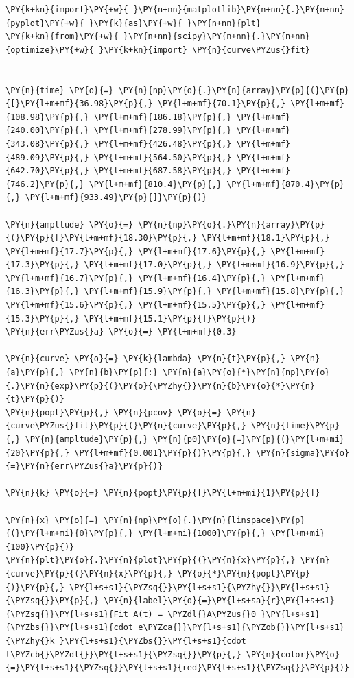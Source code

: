    \begin{tcolorbox}[breakable, size=fbox, boxrule=1pt, pad at break*=1mm,colback=cellbackground, colframe=cellborder]
\begin{Verbatim}[commandchars=\\\{\}]
\PY{k+kn}{import}\PY{+w}{ }\PY{n+nn}{matplotlib}\PY{n+nn}{.}\PY{n+nn}{pyplot}\PY{+w}{ }\PY{k}{as}\PY{+w}{ }\PY{n+nn}{plt}
\PY{k+kn}{from}\PY{+w}{ }\PY{n+nn}{scipy}\PY{n+nn}{.}\PY{n+nn}{optimize}\PY{+w}{ }\PY{k+kn}{import} \PY{n}{curve\PYZus{}fit}


\PY{n}{time} \PY{o}{=} \PY{n}{np}\PY{o}{.}\PY{n}{array}\PY{p}{(}\PY{p}{[}\PY{l+m+mf}{36.98}\PY{p}{,} \PY{l+m+mf}{70.1}\PY{p}{,} \PY{l+m+mf}{108.98}\PY{p}{,} \PY{l+m+mf}{186.18}\PY{p}{,} \PY{l+m+mf}{240.00}\PY{p}{,} \PY{l+m+mf}{278.99}\PY{p}{,} \PY{l+m+mf}{343.08}\PY{p}{,} \PY{l+m+mf}{426.48}\PY{p}{,} \PY{l+m+mf}{489.09}\PY{p}{,} \PY{l+m+mf}{564.50}\PY{p}{,} \PY{l+m+mf}{642.70}\PY{p}{,} \PY{l+m+mf}{687.58}\PY{p}{,} \PY{l+m+mf}{746.2}\PY{p}{,} \PY{l+m+mf}{810.4}\PY{p}{,} \PY{l+m+mf}{870.4}\PY{p}{,} \PY{l+m+mf}{933.49}\PY{p}{]}\PY{p}{)}

\PY{n}{ampltude} \PY{o}{=} \PY{n}{np}\PY{o}{.}\PY{n}{array}\PY{p}{(}\PY{p}{[}\PY{l+m+mf}{18.30}\PY{p}{,} \PY{l+m+mf}{18.1}\PY{p}{,} \PY{l+m+mf}{17.7}\PY{p}{,} \PY{l+m+mf}{17.6}\PY{p}{,} \PY{l+m+mf}{17.3}\PY{p}{,} \PY{l+m+mf}{17.0}\PY{p}{,} \PY{l+m+mf}{16.9}\PY{p}{,} \PY{l+m+mf}{16.7}\PY{p}{,} \PY{l+m+mf}{16.4}\PY{p}{,} \PY{l+m+mf}{16.3}\PY{p}{,} \PY{l+m+mf}{15.9}\PY{p}{,} \PY{l+m+mf}{15.8}\PY{p}{,} \PY{l+m+mf}{15.6}\PY{p}{,} \PY{l+m+mf}{15.5}\PY{p}{,} \PY{l+m+mf}{15.3}\PY{p}{,} \PY{l+m+mf}{15.1}\PY{p}{]}\PY{p}{)} 
\PY{n}{err\PYZus{}a} \PY{o}{=} \PY{l+m+mf}{0.3}

\PY{n}{curve} \PY{o}{=} \PY{k}{lambda} \PY{n}{t}\PY{p}{,} \PY{n}{a}\PY{p}{,} \PY{n}{b}\PY{p}{:} \PY{n}{a}\PY{o}{*}\PY{n}{np}\PY{o}{.}\PY{n}{exp}\PY{p}{(}\PY{o}{\PYZhy{}}\PY{n}{b}\PY{o}{*}\PY{n}{t}\PY{p}{)}
\PY{n}{popt}\PY{p}{,} \PY{n}{pcov} \PY{o}{=} \PY{n}{curve\PYZus{}fit}\PY{p}{(}\PY{n}{curve}\PY{p}{,} \PY{n}{time}\PY{p}{,} \PY{n}{ampltude}\PY{p}{,} \PY{n}{p0}\PY{o}{=}\PY{p}{(}\PY{l+m+mi}{20}\PY{p}{,} \PY{l+m+mf}{0.001}\PY{p}{)}\PY{p}{,} \PY{n}{sigma}\PY{o}{=}\PY{n}{err\PYZus{}a}\PY{p}{)}

\PY{n}{k} \PY{o}{=} \PY{n}{popt}\PY{p}{[}\PY{l+m+mi}{1}\PY{p}{]}

\PY{n}{x} \PY{o}{=} \PY{n}{np}\PY{o}{.}\PY{n}{linspace}\PY{p}{(}\PY{l+m+mi}{0}\PY{p}{,} \PY{l+m+mi}{1000}\PY{p}{,} \PY{l+m+mi}{100}\PY{p}{)}
\PY{n}{plt}\PY{o}{.}\PY{n}{plot}\PY{p}{(}\PY{n}{x}\PY{p}{,} \PY{n}{curve}\PY{p}{(}\PY{n}{x}\PY{p}{,} \PY{o}{*}\PY{n}{popt}\PY{p}{)}\PY{p}{,} \PY{l+s+s1}{\PYZsq{}}\PY{l+s+s1}{\PYZhy{}}\PY{l+s+s1}{\PYZsq{}}\PY{p}{,} \PY{n}{label}\PY{o}{=}\PY{l+s+sa}{r}\PY{l+s+s1}{\PYZsq{}}\PY{l+s+s1}{Fit A(t) = \PYZdl{}A\PYZus{}0 }\PY{l+s+s1}{\PYZbs{}}\PY{l+s+s1}{cdot e\PYZca{}}\PY{l+s+s1}{\PYZob{}}\PY{l+s+s1}{\PYZhy{}k }\PY{l+s+s1}{\PYZbs{}}\PY{l+s+s1}{cdot t\PYZcb{}\PYZdl{}}\PY{l+s+s1}{\PYZsq{}}\PY{p}{,} \PY{n}{color}\PY{o}{=}\PY{l+s+s1}{\PYZsq{}}\PY{l+s+s1}{red}\PY{l+s+s1}{\PYZsq{}}\PY{p}{)}


\end{Verbatim}
\end{tcolorbox}
